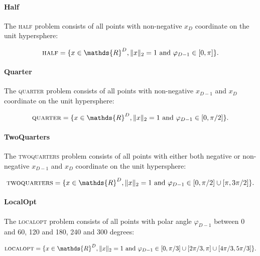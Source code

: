 \paragraph{Half}
The \textsc{half} problem consists of all points with non-negative $x_D$ coordinate on the unit hypersphere:

\[
    \textsc{half} = \{x \in \mathds{R}^D, \lVert x \rVert_2 = 1 \text{ and } \varphi_{D-1} \in [0, \pi]\}.
\]

\paragraph{Quarter}
The \textsc{quarter} problem consists of all points with non-negative $x_{D-1}$ and $x_D$ coordinate on the unit hypersphere:

\[
    \textsc{quarter} = \{x \in \mathds{R}^D, \lVert x \rVert_2 = 1 \text{ and } \varphi_{D-1} \in [0, \pi / 2]\}.
\]

\paragraph{TwoQuarters}
The \textsc{twoquarters} problem consists of all points with either both negative or non-negative $x_{D-1}$ and $x_D$ coordinate on the unit hypersphere:

\[
    \textsc{twoquarters} = \{x \in \mathds{R}^D, \lVert x \rVert_2 = 1 \text{ and } \varphi_{D-1} \in [0, \pi / 2] \cup [\pi, 3\pi / 2]\}.
\]

\paragraph{LocalOpt}
The \textsc{localopt} problem consists of all points with polar angle $\varphi_{D-1}$ between 0 and 60, 120 and 180, 240 and 300 degrees:

\[
    \textsc{localopt} = \{x \in \mathds{R}^D, \lVert x \rVert_2 = 1 \text{ and } \varphi_{D-1} \in [0, \pi / 3] \cup [2\pi / 3, \pi] \cup [4\pi / 3, 5\pi / 3]\}.
\]

